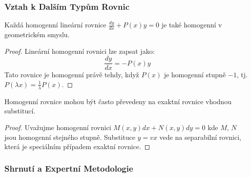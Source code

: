 \subsubsection{Vztah k Dalším Typům Rovnic}
\label{subsubsec:vztah-k-dalsim-rovnicim}

\begin{theorem}
Každá homogenní lineární rovnice $\frac{dy}{dx} + P(x)y = 0$ je také homogenní v geometrickém smyslu.
\end{theorem}

\vspace{0.4\baselineskip}

\begin{proof}
Lineární homogenní rovnici lze zapsat jako:
\[
\frac{dy}{dx} = -P(x)y
\]
Tato rovnice je homogenní právě tehdy, když $P(x)$ je homogenní stupně $-1$, tj. $P(\lambda x) = \frac{1}{\lambda}P(x)$.
\end{proof}

\vspace{0.6\baselineskip}

\begin{theorem}
Homogenní rovnice mohou být často převedeny na exaktní rovnice vhodnou substitucí.
\end{theorem}

\vspace{0.4\baselineskip}

\begin{proof}
Uvažujme homogenní rovnici $M(x,y)dx + N(x,y)dy = 0$ kde $M$, $N$ jsou homogenní stejného stupně. Substituce $y = vx$ vede na separabilní rovnici, která je speciálním případem exaktní rovnice.
\end{proof}

\vspace{0.8\baselineskip}

\subsubsection{Shrnutí a Expertní Metodologie}
\label{subsubsec:shrnuti-metodologie}

